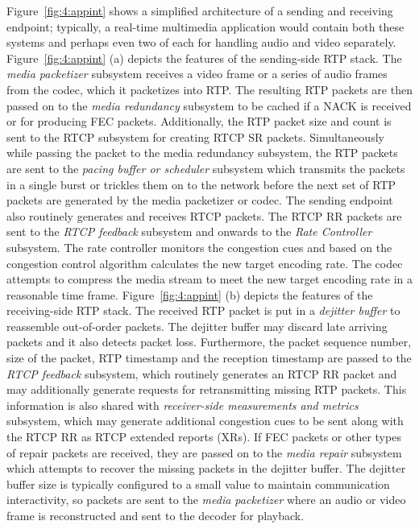Figure~\ref{fig:4:appint} shows a simplified architecture of a sending and
receiving endpoint; typically, a real-time multimedia application would
contain both these systems and perhaps even two of each for handling audio and
video separately. Figure~\ref{fig:4:appint} (a) depicts the features of the
sending-side RTP stack. The \emph{media packetizer} subsystem receives a video frame or a
series of audio frames from the codec, which it packetizes into RTP.  The
resulting RTP packets are then passed on to the \emph{media redundancy} subsystem to
be cached if a NACK is received or for producing FEC packets. Additionally,
the RTP packet size and count is sent to the RTCP subsystem for creating RTCP
SR packets. Simultaneously while passing the packet to the media redundancy
subsystem, the RTP packets are sent to the \emph{pacing buffer or scheduler} subsystem which
transmits the packets in a single burst or trickles them on to the network
before the next set of RTP packets are generated by the media packetizer or codec. The
sending endpoint also routinely generates and receives RTCP packets. 
The RTCP RR packets are sent to the \emph{RTCP feedback} subsystem and 
onwards to the \emph{Rate Controller} subsystem.
The rate controller monitors the congestion cues and based on the congestion control
algorithm calculates the  new target encoding rate. The codec attempts to
compress the media stream to meet the new target encoding rate in a reasonable
time frame. Figure~\ref{fig:4:appint} (b) depicts the features of the
receiving-side RTP stack. The received RTP packet is put in a \emph{dejitter buffer}
to reassemble out-of-order packets. The dejitter buffer may discard late
arriving packets and it also detects packet loss. Furthermore, the packet
sequence number, size of the packet, RTP timestamp and the reception
timestamp are passed to the \emph{RTCP feedback} subsystem, which routinely generates an
RTCP RR packet and may additionally generate requests for retransmitting
missing RTP packets. This information is also shared with \emph{receiver-side
measurements and metrics} subsystem, which may generate additional congestion
cues to be sent along with the RTCP RR as RTCP extended reports (XRs). If FEC
packets or other types of repair packets are received, they are passed on to
the \emph{media repair} subsystem which attempts to recover the missing packets in
the dejitter buffer. The dejitter buffer size is typically configured to a small value to maintain
communication interactivity, so packets are sent to the \emph{media packetizer} where
an audio or video frame is reconstructed and sent to the decoder for playback.


